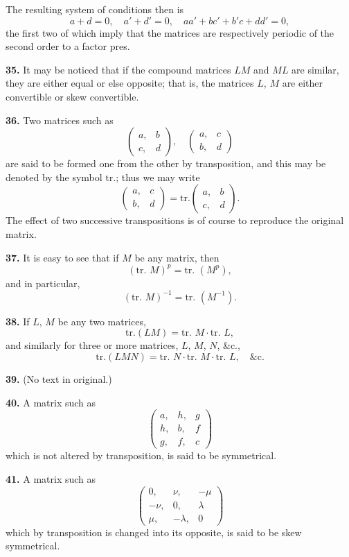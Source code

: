 \documentclass[12pt,a4paper]{article}
\theoremstyle{definition}
\begin{document}
The resulting system of conditions then is
\[
a+d=0,\quad a'+d'=0,\quad aa'+bc'+b'c+dd'=0,
\]
the first two of which imply that the matrices are respectively periodic of the second order to a factor pres.

\medskip
\noindent\textbf{35.} It may be noticed that if the compound matrices $LM$ and $ML$ are similar, they are either equal or else opposite; that is, the matrices $L$, $M$ are either convertible or skew convertible.

\medskip
\noindent\textbf{36.} Two matrices such as
\[
\begin{pmatrix} a, & b \\ c, & d \end{pmatrix},\quad
\begin{pmatrix} a, & c \\ b, & d \end{pmatrix}
\]
are said to be formed one from the other by transposition, and this may be denoted by the symbol $\text{tr.}$; thus we may write
\[
\begin{pmatrix} a, & c \\ b, & d \end{pmatrix} = \text{tr.} \begin{pmatrix} a, & b \\ c, & d \end{pmatrix}.
\]
The effect of two successive transpositions is of course to reproduce the original matrix.

\medskip
\noindent\textbf{37.} It is easy to see that if $M$ be any matrix, then
\[(\text{tr. }M)^p = \text{tr. }(M^p),\]
and in particular,
\[(\text{tr. }M)^{-1} = \text{tr. }(M^{-1}).\]

\medskip
\noindent\textbf{38.} If $L$, $M$ be any two matrices,
\[\text{tr.}(LM) = \text{tr. }M \cdot \text{tr. }L,\]
and similarly for three or more matrices, $L$, $M$, $N$, \&c.,
\[\text{tr.}(LMN) = \text{tr. }N \cdot \text{tr. }M \cdot \text{tr. }L, \quad \&\text{c.}\]

\medskip
\noindent\textbf{39.} (No text in original.)

\medskip
\noindent\textbf{40.} A matrix such as
\[
\begin{pmatrix} a, & h, & g \\ h, & b, & f \\ g, & f, & c \end{pmatrix}
\]
which is not altered by transposition, is said to be symmetrical.

\medskip
\noindent\textbf{41.} A matrix such as
\[
\begin{pmatrix} 0, & \nu, & -\mu \\ -\nu, & 0, & \lambda \\ \mu, & -\lambda, & 0 \end{pmatrix}
\]
which by transposition is changed into its opposite, is said to be skew symmetrical.
\end{document}
